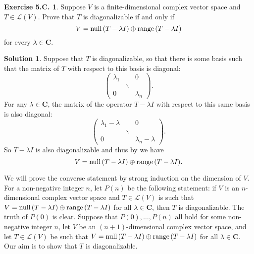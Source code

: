 \documentclass[12pt]{article}
\theoremstyle{definition}
\theoremstyle{exercise}
\newtheorem{exercise}{Exercise 5.C.}
\theoremstyle{solution}
\newtheorem*{solution}{Solution}
\newcommand{\lmap}{\mathcal{L}}
\newcommand{\Null}{\text{null\,}}
\newcommand{\Range}{\text{range\,}}
\newcommand{\C}{\mathbf{C}}
\begin{document}
\begin{exercise}
\label{ex:5}
    Suppose \( V \) is a finite-dimensional complex vector space and \( T \in \lmap(V) \). Prove that \( T \) is diagonalizable if and only if
    \[
        V = \Null (T - \lambda I) \oplus \Range (T - \lambda I)
    \]
    for every \( \lambda \in \C \).
\end{exercise}

\begin{solution}
    Suppose that \( T \) is diagonalizable, so that there is some basis such that the matrix of \( T \) with respect to this basis is diagonal:
    \[
        \begin{pmatrix}
            \lambda_1 & & 0 \\
            & \ddots & \\
            0 & & \lambda_n
        \end{pmatrix}.
    \]
    For any \( \lambda \in \C \), the matrix of the operator \( T - \lambda I \) with respect to this same basis is also diagonal:
    \[
        \begin{pmatrix}
            \lambda_1 - \lambda & & 0 \\
            & \ddots & \\
            0 & & \lambda_n - \lambda
        \end{pmatrix}.
    \]
    So \( T - \lambda I \) is also diagonalizable and thus by  we have
    \[
        V = \Null (T - \lambda I) \oplus \Range (T - \lambda I).
    \]

    We will prove the converse statement by strong induction on the dimension of \( V \). For a non-negative integer \( n \), let \( P(n) \) be the following statement: if \( V \) is an \( n \)-dimensional complex vector space and \( T \in \lmap(V) \) is such that \( V = \Null(T - \lambda I) \oplus \Range(T - \lambda I) \) for all \( \lambda \in \C \), then \( T \) is diagonalizable. The truth of \( P(0) \) is clear. Suppose that \( P(0), \ldots, P(n) \) all hold for some non-negative integer \( n \), let \( V \) be an \( (n + 1) \)-dimensional complex vector space, and let \( T \in \lmap(V) \) be such that \( V = \Null(T - \lambda I) \oplus \Range(T - \lambda I) \) for all \( \lambda \in \C \). Our aim is to show that \( T \) is diagonalizable.
    

\end{solution}
\end{document}
